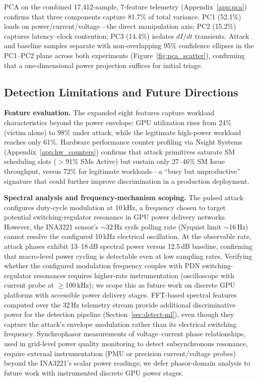 \documentclass[letterpaper,twocolumn,10pt]{article}
\begin{document}
PCA on the combined 17{,}412-sample, 7-feature telemetry
(Appendix~\ref{app:pca}) confirms that three components capture
81.7\% of total variance.  PC1 (52.1\%) loads on
power/current/voltage---the direct manipulation axis; PC2 (15.2\%)
captures latency--clock contention; PC3 (14.4\%) isolates $dI/dt$
transients.  Attack and baseline samples separate with
non-overlapping 95\% confidence ellipses in the PC1--PC2 plane
across both experiments (Figure~\ref{fig:pca_scatter}),
confirming that a one-dimensional power projection suffices for
initial triage.

\subsection{Detection Limitations and Future Directions}
\label{sec:detect-limits}

\textbf{Feature evaluation.}
The expanded eight features capture workload characteristics beyond
the power envelope: GPU utilization rises from 24\% (victim alone) to
98\% under attack, while the legitimate high-power workload reaches
only 61\%.  Hardware performance counter profiling via Nsight Systems
(Appendix~\ref{app:hw_counters}) confirms that attack primitives
saturate SM scheduling slots ($>$91\% SMs Active) but sustain only
27--46\% SM Issue throughput, versus 72\% for legitimate workloads---a
``busy but unproductive'' signature that could further improve
discrimination in a production deployment.

\textbf{Spectral analysis and frequency-mechanism scoping.}
The pulsed attack configures duty-cycle modulation at 10\,kHz,
a frequency chosen to target potential switching-regulator resonance
in GPU power delivery networks.  However, the INA3221 sensor's
$\sim$32\,Hz sysfs polling rate (Nyquist limit $\sim$16\,Hz) cannot
resolve the configured 10\,kHz electrical oscillation.  At the
observable rate, attack phases exhibit 13--18\,dB spectral power
versus 12.5\,dB baseline, confirming that macro-level power cycling
is detectable even at low sampling rates.  Verifying whether the
configured modulation frequency couples with PDN switching-regulator
resonances requires higher-rate instrumentation (oscilloscope with
current probe at $\geq$100\,kHz); we scope this as future work on
discrete GPU platforms with accessible power delivery stages.
FFT-based spectral features computed over the 32\,Hz telemetry
stream provide additional discriminative power for the detection
pipeline (Section~\ref{sec:detect-ml}), even though they capture
the attack's envelope modulation rather than its electrical
switching frequency.
Synchrophasor measurements of voltage--current phase
relationships, used in grid-level power quality monitoring to
detect subsynchronous resonance, require external instrumentation
(PMU or precision current/voltage probes) beyond the INA3221's
scalar power readings; we defer phasor-domain analysis to future
work with instrumented discrete GPU power stages.
\end{document}
